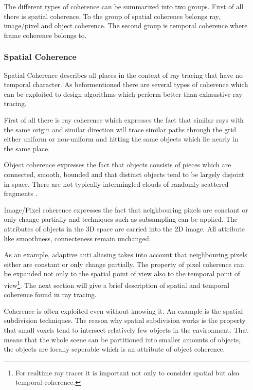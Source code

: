 \documentclass[DIV10, abstracton, openright, footsepline, headsepline, twoside, 9pt,
bigheadings]{scrreprt}
\begin{document}
The different types of coherence can be summarized into two groups. First of all
there is spatial coherence. To the group of spatial coherence belongs ray,
image/pixel and object coherence. The second group is temporal coherence where
frame coherence belongs to.

\subsubsection{Spatial Coherence}
\label{sec:coherence}
Spatial Coherence describes all places in the context of ray tracing that
have no temporal character. As beformentioned there are several types of
coherence which can be exploited to design algorithms which perform better than
exhaustive ray tracing.

First of all there is ray coherence which expresses the fact that similar rays
with the same origin and similar direction will trace similar paths through the
grid either uniform or non-uniform and hitting  the same objects which  lie
nearly in the same place.

Object coherence expresses the fact that objects consists of pieces which are
connected, smooth, bounded and that distinct objects tend to be largely
disjoint in space. There are not typically intermingled clouds of randomly
scattered fragments \cite{Glassner89}.

Image/Pixel coherence expresses the fact that neighbouring pixels are constant or
only change partially and techniques such as subsampling can be applied. The
attributes of objects in the 3D space are carried into the 2D image. All
attribute like smoothness, connecteness remain unchanged.

As an example, adaptive anti aliasing takes into account that neighbouring
pixels either are constant or only change partially. The property of pixel
coherence can be expanded not only to the spatial point of view also to the
temporal point of view\footnote{For realtime ray tracer it is important not
only to consider spatial but also temporal coherence.}. The next section will
give a brief description of spatial and temporal coherence found in ray tracing.


Coherence is often exploited even without knowing it. An example is the spatial
subdivision techniques. The reason why spatial subdivision works is
the property that small voxels tend to intersect relatively few objects in the
environment. That means that the whole scene can be partitioned into smaller
amounts of objects, the objects are locally seperable which is an attribute of
object coherence\cite{Glassner89}.
\end{document}
